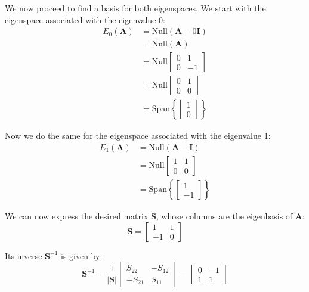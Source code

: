 \documentclass{article}
\begin{document}
We now proceed to find a basis for both eigenspaces. We start with the eigenspace associated with the eigenvalue 0:
\begin{align*}
    E_0(\mathbf{A})&=\text{Null}(\mathbf{A}-0\mathbf{I})\tag{def. of eigenspace}\\
    &=\text{Null}(\mathbf{A})\\
    &=\text{Null}\begin{bmatrix} 0 & 1 \\ 0 & -1 \end{bmatrix}\\
    &=\text{Null}\begin{bmatrix} 0 & 1 \\ 0 & 0 \end{bmatrix}\tag{ref}\\
    &=\text{Span}\left\{\begin{bmatrix} 1\\0\end{bmatrix}\right\}\tag{$x_2=0$, $x_1$ free}
\end{align*}

Now we do the same for the eigenspace associated with the eigenvalue 1:
\begin{align*}
    E_1(\mathbf{A})&=\text{Null}(\mathbf{A}-\mathbf{I})\tag{def. of eigenspace}\\
    &=\text{Null}\begin{bmatrix} 1 & 1 \\ 0 & 0 \end{bmatrix}\\
    &=\text{Span}\left\{\begin{bmatrix} 1\\-1\end{bmatrix}\right\}\tag{$x_2=-x_1$}
\end{align*}

We can now express the desired matrix $\mathbf{S}$, whose columns are the eigenbasis of $\mathbf{A}$:
\begin{equation*}
    \mathbf{S}=\begin{bmatrix} 1&1\\-1&0\end{bmatrix}
\end{equation*}

Its inverse $\mathbf{S}^{-1}$ is given by:
\begin{equation*}
\mathbf{S}^{-1}=\frac{1}{|\mathbf{S}|}\begin{bmatrix} S_{22}&-S_{12}\\-S_{21}&S_{11}\end{bmatrix}=\begin{bmatrix} 0&-1\\1&1\end{bmatrix}
\end{equation*}
\end{document}

